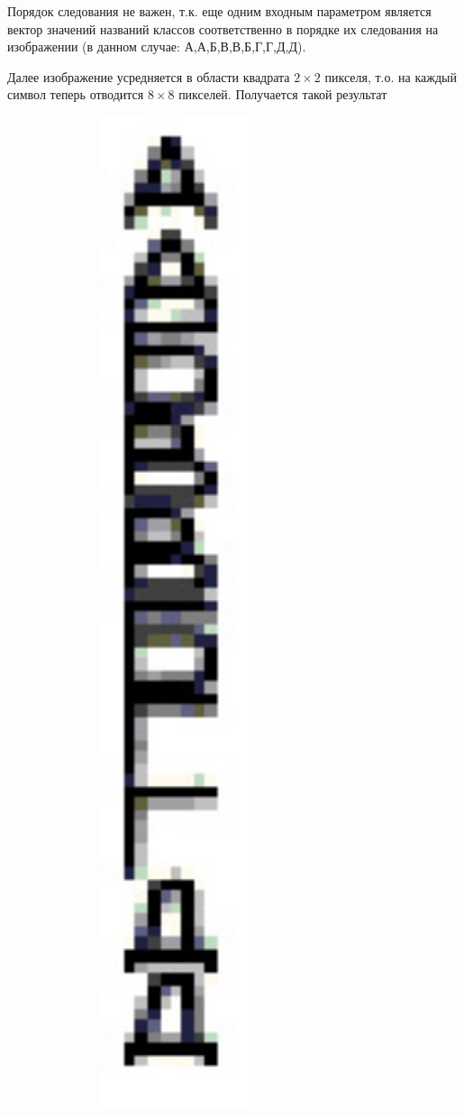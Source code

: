 Порядок следования не важен, т.к. еще одним входным параметром является вектор значений названий классов соответственно в порядке их следования на изображении (в данном случае: {А,А,Б,В,В,Б,Г,Г,Д,Д}).

Далее изображение усредняется в области квадрата $2\times 2$ пикселя, т.о. на каждый символ теперь отводится $8\times 8$ пикселей. Получается такой результат
\begin{center}
	\includegraphics[width=10cm]{image_for_report/teach_5_2.jpg}
\end{center}

